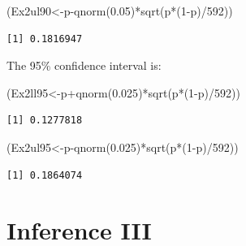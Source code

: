 \documentclass[
  letterpaper,
  DIV=11,
  numbers=noendperiod]{scrreprt}
\newenvironment{Shaded}{\begin{snugshade}}{\end{snugshade}}
\newcommand{\DecValTok}[1]{\textcolor[rgb]{0.68,0.00,0.00}{#1}}
\newcommand{\FloatTok}[1]{\textcolor[rgb]{0.68,0.00,0.00}{#1}}
\newcommand{\FunctionTok}[1]{\textcolor[rgb]{0.28,0.35,0.67}{#1}}
\newcommand{\NormalTok}[1]{\textcolor[rgb]{0.00,0.23,0.31}{#1}}
\newcommand{\OtherTok}[1]{\textcolor[rgb]{0.00,0.23,0.31}{#1}}
\newcommand{\SpecialCharTok}[1]{\textcolor[rgb]{0.37,0.37,0.37}{#1}}
\begin{document}
\begin{Shaded}
\begin{Highlighting}[numbers=left,,]
\NormalTok{(Ex2ul90}\OtherTok{\textless{}{-}}\NormalTok{p}\SpecialCharTok{{-}}\FunctionTok{qnorm}\NormalTok{(}\FloatTok{0.05}\NormalTok{)}\SpecialCharTok{*}\FunctionTok{sqrt}\NormalTok{(p}\SpecialCharTok{*}\NormalTok{(}\DecValTok{1}\SpecialCharTok{{-}}\NormalTok{p)}\SpecialCharTok{/}\DecValTok{592}\NormalTok{))}
\end{Highlighting}
\end{Shaded}

\begin{verbatim}
[1] 0.1816947
\end{verbatim}

The 95\% confidence interval is:

\begin{Shaded}
\begin{Highlighting}[numbers=left,,]
\NormalTok{(Ex2ll95}\OtherTok{\textless{}{-}}\NormalTok{p}\SpecialCharTok{+}\FunctionTok{qnorm}\NormalTok{(}\FloatTok{0.025}\NormalTok{)}\SpecialCharTok{*}\FunctionTok{sqrt}\NormalTok{(p}\SpecialCharTok{*}\NormalTok{(}\DecValTok{1}\SpecialCharTok{{-}}\NormalTok{p)}\SpecialCharTok{/}\DecValTok{592}\NormalTok{))}
\end{Highlighting}
\end{Shaded}

\begin{verbatim}
[1] 0.1277818
\end{verbatim}

\begin{Shaded}
\begin{Highlighting}[numbers=left,,]
\NormalTok{(Ex2ul95}\OtherTok{\textless{}{-}}\NormalTok{p}\SpecialCharTok{{-}}\FunctionTok{qnorm}\NormalTok{(}\FloatTok{0.025}\NormalTok{)}\SpecialCharTok{*}\FunctionTok{sqrt}\NormalTok{(p}\SpecialCharTok{*}\NormalTok{(}\DecValTok{1}\SpecialCharTok{{-}}\NormalTok{p)}\SpecialCharTok{/}\DecValTok{592}\NormalTok{))}
\end{Highlighting}
\end{Shaded}

\begin{verbatim}
[1] 0.1864074
\end{verbatim}

\hypertarget{inference-iii}{%
\chapter{Inference III}\label{inference-iii}}
\end{document}
